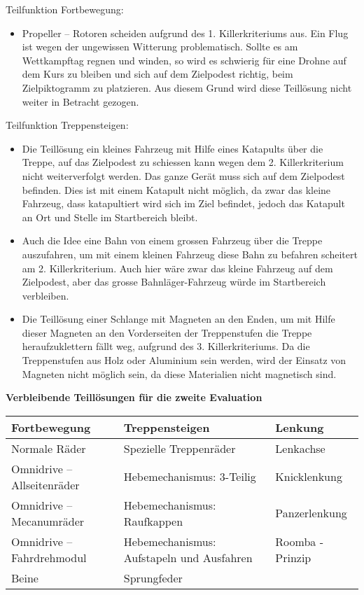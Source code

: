 Teilfunktion Fortbewegung:
\begin{itemize}
    \item Propeller – Rotoren scheiden aufgrund des 1. Killerkriteriums aus. Ein Flug ist wegen der ungewissen Witterung problematisch. Sollte es am Wettkampftag regnen und winden, so wird es schwierig für eine Drohne auf dem Kurs zu bleiben und sich auf dem Zielpodest richtig, beim Zielpiktogramm zu platzieren. Aus diesem Grund wird diese Teillösung nicht weiter in Betracht gezogen.
\end{itemize}

Teilfunktion Treppensteigen:
\begin{itemize}
    \item Die Teillösung ein kleines Fahrzeug mit Hilfe eines Katapults über die Treppe, auf das Zielpodest zu schiessen kann wegen dem 2. Killerkriterium nicht weiterverfolgt werden. Das ganze Gerät muss sich auf dem Zielpodest befinden. Dies ist mit einem Katapult nicht möglich, da zwar das kleine Fahrzeug, dass katapultiert wird sich im Ziel befindet, jedoch das Katapult an Ort und Stelle im Startbereich bleibt.
    \item Auch die Idee eine Bahn von einem grossen Fahrzeug über die Treppe auszufahren, um mit einem kleinen Fahrzeug diese Bahn zu befahren scheitert am 2. Killerkriterium. Auch hier wäre zwar das kleine Fahrzeug auf dem Zielpodest, aber das grosse Bahnläger-Fahrzeug würde im Startbereich verbleiben.
    \item Die Teillösung einer Schlange mit Magneten an den Enden, um mit Hilfe dieser Magneten an den Vorderseiten der Treppenstufen die Treppe heraufzuklettern fällt weg, aufgrund des 3. Killerkriteriums. Da die Treppenstufen aus Holz oder Aluminium sein werden, wird der Einsatz von Magneten nicht möglich sein, da diese Materialien nicht magnetisch sind.
\end{itemize}

\textbf{Verbleibende Teillösungen für die zweite Evaluation}

\begin{longtable}[h]{l|l|l}
\textbf{Fortbewegung} & \textbf{Treppensteigen} & \textbf{Lenkung} 
\tabularnewline
\endhead
Normale Räder & Spezielle Treppenräder & Lenkachse 
\tabularnewline
Omnidrive – Allseitenräder & Hebemechanismus: 3-Teilig & Knicklenkung 
\tabularnewline
Omnidrive – Mecanumräder & Hebemechanismus: Raufkappen & Panzerlenkung 
\tabularnewline
Omnidrive – Fahrdrehmodul & Hebemechanismus: Aufstapeln und Ausfahren & Roomba - Prinzip 
\tabularnewline
Beine & Sprungfeder &
\end{longtable}

